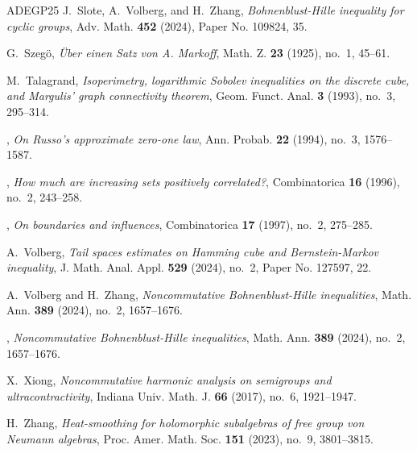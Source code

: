 \documentclass{amsbook}
\theoremstyle{definition}
\theoremstyle{remark}
\numberwithin{section}{chapter}
\numberwithin{equation}{chapter}
\newcommand{\1}{\mathbf{1}}
\begin{document}
\begin{thebibliography}{ADEGP25}
	J.~Slote, A.~Volberg, and H.~Zhang, \emph{Bohnenblust-{H}ille inequality for
		cyclic groups}, Adv. Math. \textbf{452} (2024), Paper No. 109824, 35.
	
	G.~Szeg\"{o}, \emph{\"{U}ber einen {S}atz von {A}. {M}arkoff}, Math. Z.
	\textbf{23} (1925), no.~1, 45--61. 
	
	M.~Talagrand, \emph{Isoperimetry, logarithmic {S}obolev inequalities on the
		discrete cube, and {M}argulis' graph connectivity theorem}, Geom. Funct.
	Anal. \textbf{3} (1993), no.~3, 295--314.
	
	\bysame, \emph{On {R}usso's approximate zero-one law}, Ann. Probab. \textbf{22}
	(1994), no.~3, 1576--1587.
	
	\bysame, \emph{How much are increasing sets positively correlated?},
	Combinatorica \textbf{16} (1996), no.~2, 243--258. 
	
	\bysame, \emph{On boundaries and influences}, Combinatorica \textbf{17} (1997),
	no.~2, 275--285.
	
	A.~Volberg, \emph{Tail spaces estimates on {H}amming cube and
		{B}ernstein-{M}arkov inequality}, J. Math. Anal. Appl. \textbf{529} (2024),
	no.~2, Paper No. 127597, 22. 
	
	A.~Volberg and H.~Zhang, \emph{Noncommutative {B}ohnenblust-{H}ille
		inequalities}, Math. Ann. \textbf{389} (2024), no.~2, 1657--1676.
	
	\bysame, \emph{Noncommutative {B}ohnenblust-{H}ille inequalities}, Math. Ann.
	\textbf{389} (2024), no.~2, 1657--1676. 
	
	X.~Xiong, \emph{Noncommutative harmonic analysis on semigroups and
		ultracontractivity}, Indiana Univ. Math. J. \textbf{66} (2017), no.~6,
	1921--1947. 
	
	H.~Zhang, \emph{Heat-smoothing for holomorphic subalgebras of free group von
		{N}eumann algebras}, Proc. Amer. Math. Soc. \textbf{151} (2023), no.~9,
	3801--3815. 
	
\end{thebibliography}
\end{document}
